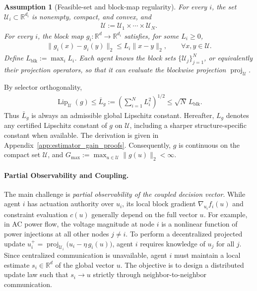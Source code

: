 \documentclass[letterpaper, 10 pt, conference]{ieeeconf} %
\newtheorem{assumption}{Assumption}
\DeclareMathOperator{\proj}{proj}
\begin{document}
\begin{assumption}[Feasible-set and block-map regularity]
\label{ass:smooth_c}
For every \(i\), the set \(\mathcal U_i\subset\mathbb R^{d_i}\) is nonempty, compact, and convex, and
\begin{align}
\mathcal U:=\mathcal U_1\times\cdots\times\mathcal U_N.
\end{align}
For every \(i\), the block map \(g_i:\mathbb R^d\to\mathbb R^{d_i}\) satisfies, for some \(L_i\ge0\),
\begin{align}
\|g_i(x)-g_i(y)\|_2
\le L_i\|x-y\|_2,
\qquad \forall x,y\in\mathcal U.
\end{align}
Define \(L_{\mathrm{blk}}:=\max_i L_i\). Each agent knows the block sets \(\{\mathcal U_j\}_{j=1}^N\), or equivalently their projection operators, so that it can evaluate the blockwise projection \(\proj_{\mathcal U}\).
\end{assumption}
By selector orthogonality,
\begin{align}
\operatorname{Lip}_{\mathcal U}(g)
\le
\bar L_g
:=
\left(\sum_{i=1}^N L_i^2\right)^{1/2}
\le
\sqrt N\,L_{\mathrm{blk}}.
\end{align}
Thus \(\bar L_g\) is always an admissible global Lipschitz constant. Hereafter, \(L_g\) denotes any certified Lipschitz constant of \(g\) on \(\mathcal U\), including a sharper structure-specific constant when available. The derivation is given in Appendix~\ref{app:estimator_gain_proofs}.
Consequently, \(g\) is continuous on the compact set \(\mathcal U\), and \(G_{\max}:=\max_{u\in\mathcal U}\|g(u)\|_2<\infty\).
\paragraph*{Partial Observability and Coupling.} 
The main challenge is \textit{partial observability of the coupled decision vector}. While agent $i$ has actuation authority over $u_i$, its local block gradient $\nabla_{u_i} f_i(u)$ and constraint evaluation $c(u)$ generally depend on the full vector $u$. For example, in AC power flow, the voltage magnitude at node $i$ is a nonlinear function of power injections at all other nodes $j \neq i$. To perform a decentralized projected update $u_i^+=\proj_{\mathcal U_i}\!\big(u_i-\eta\, g_i(u)\big)$, agent $i$ requires knowledge of $u_j$ for all $j$. Since centralized communication is unavailable, agent $i$ must maintain a local estimate $s_i \in \mathbb{R}^d$ of the global vector $u$. The objective is to design a distributed update law such that $s_i \to u$ strictly through neighbor-to-neighbor communication.
\end{document}
